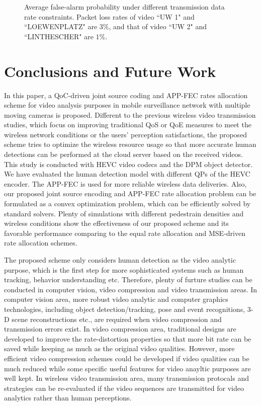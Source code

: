 \documentclass[journal]{IEEEtran}
\begin{document}
\begin{figure}[b]
\caption{Average false-alarm probability under different transmission data rate constraints. Packet loss rates of video ``UW 1" and ``LOEWENPLATZ" are $3\%$, and that of video ``UW 2" and ``LINTHESCHER" are $1\%$.}\label{fig:false_alarm_2}
\end{figure}

\newpage
\section{Conclusions and Future Work}
In this paper, a QoC-driven joint source coding and APP-FEC rates allocation scheme for video analysis purposes in mobile surveillance network with multiple moving cameras is proposed. Different to the previous wireless video transmission studies, which focus on improving traditional QoS or QoE measures to meet the wireless network conditions or the users' perception satisfactions, the proposed scheme tries to optimize the wireless resource usage so that more accurate human detections can be performed at the cloud server based on the received videos. This study is conducted with HEVC video codecs and the DPM object detector. We have evaluated the human detection model with different QPs of the HEVC encoder. The APP-FEC is used for more reliable wireless data deliveries. Also, our proposed joint source encoding and APP-FEC rate allocation problem can be formulated as a convex optimization problem, which can be efficiently solved by standard solvers. Plenty of simulations with different pedestrain densities and wireless conditions show the effectiveness of our proposed scheme and its favorable performance comparing to the equal rate allocation and MSE-driven rate allocation schemes.

The proposed scheme only considers human detection as the video analytic purpose, which is the first step for more sophisticated systems such as human tracking, behavior understanding etc. Therefore, plenty of furture studies can be conducted in computer vision, video compression and video transmission areas. In computer vision area, more robust video analytic and computer graphics technologies, including object detection/tracking, pose and event recognitions, 3-D scene reconstructions etc., are required when video compression and transmission errors exist. In video compression area, traditional designs are developed to improve the rate-distortion properties so that more bit rate can be saved while keeping as much as the original video qualities. However, more efficient video compression schemes could be developed if video qualities can be much reduced while some specific useful features for video anayltic purposes are well kept. In wireless video transmission area, many transmission protocals and strategies can be re-evaluated if the video sequences are transmitted for video analytics rather than human perceptions.
\appendices
\end{document}
